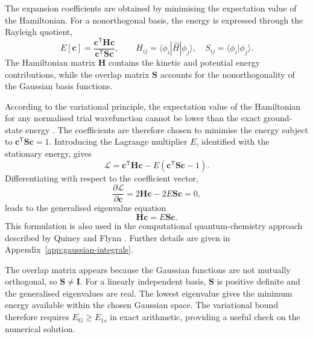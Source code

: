 The expansion coefficients are obtained by
minimising the expectation value of the
Hamiltonian. For a nonorthogonal basis,
the energy is expressed through the
Rayleigh quotient,
\begin{equation}
    E[\mathbf c]
    =\frac{\mathbf c^{\mathsf T}\mathbf H\mathbf c}
           {\mathbf c^{\mathsf T}\mathbf S\mathbf c},
    \qquad
    H_{ij}=\langle\phi_i|\hat H|\phi_j\rangle,
    \quad
    S_{ij}=\langle\phi_i|\phi_j\rangle.
    \label{eq:rayleigh_quotient}
\end{equation}
The Hamiltonian matrix $\mathbf H$ contains
the kinetic and potential energy contributions,
while the overlap matrix $\mathbf S$ accounts
for the nonorthogonality of the Gaussian
basis functions.

According to the variational principle, the
expectation value of the Hamiltonian for any
normalised trial wavefunction cannot be lower
than the exact ground-state energy
\cite{bransden_physics_2009}. The coefficients
are therefore chosen to minimise the energy
subject to
$\mathbf c^{\mathsf T}\mathbf S\mathbf c=1$.
Introducing the Lagrange multiplier $E$,
identified with the stationary energy, gives
\[
    \mathcal L
    =\mathbf c^{\mathsf T}\mathbf H\mathbf c
    -E\left(
       \mathbf c^{\mathsf T}\mathbf S\mathbf c-1
      \right).
\]
Differentiating with respect to the coefficient
vector,
\[
    \frac{\partial\mathcal L}{\partial\mathbf c}
    =2\mathbf H\mathbf c
     -2E\mathbf S\mathbf c=0,
\]
leads to the generalised eigenvalue equation
\begin{equation}
    \mathbf H\mathbf c=E\mathbf S\mathbf c.
    \label{eq:generalised_eigenproblem}
\end{equation}
This formulation is also used in the
computational quantum-chemistry approach
described by Quiney and Flynn
\cite{quiney_art_2018}. Further details
are given in Appendix~\ref{app:gaussian-integrals}.

The overlap matrix appears because the
Gaussian functions are not mutually
orthogonal, so $\mathbf S\neq\mathbf I$.
For a linearly independent basis,
$\mathbf S$ is positive definite and
the generalised eigenvalues are real.
The lowest eigenvalue gives the minimum
energy available within the chosen
Gaussian space. The variational bound
therefore requires
$E_{\mathrm G}\geq E_{1s}$ in exact
arithmetic, providing a useful check
on the numerical solution.

